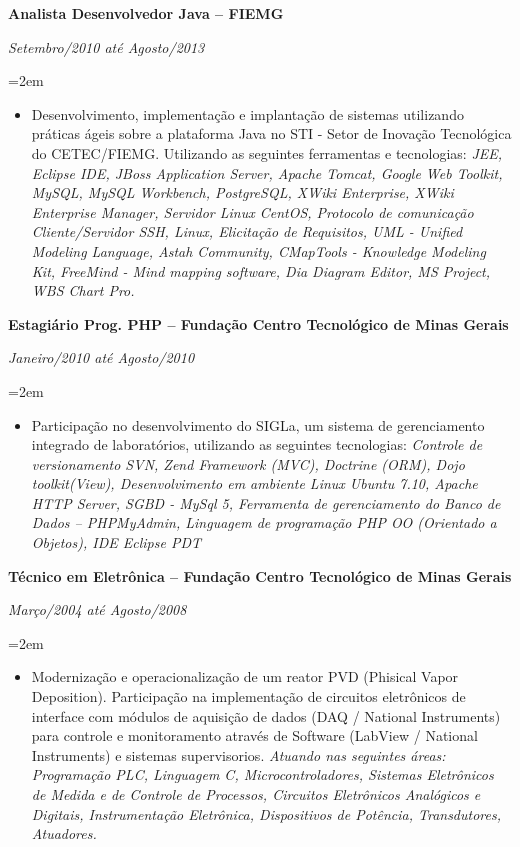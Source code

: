\documentclass[paper=a4,fontsize=11pt]{scrartcl} %
\newcommand{\EducationEntry}[4]{
		\noindent \textbf{#1} \hfill      %
		\colorbox{White}{%
			\parbox{5cm}{%
			\hfill\color{Black}#2}} \par  %
		\noindent \textit{#3} \par        %
		\noindent\hangindent=2em\hangafter=0 \small #4 %
		\normalsize \par}
\begin{document}
\EducationEntry{Analista Desenvolvedor Java – FIEMG}{}{Setembro/2010 até Agosto/2013}{
	\begin{itemize}
		\item{Desenvolvimento, implementação e implantação de sistemas utilizando práticas ágeis sobre 
		a plataforma Java no STI - Setor de Inovação Tecnológica do CETEC/FIEMG. Utilizando as seguintes ferramentas e tecnologias: \newline \newline
		      \textit{JEE, Eclipse IDE, JBoss Application Server, Apache Tomcat, Google Web Toolkit,
			  MySQL, MySQL Workbench, PostgreSQL, XWiki Enterprise, XWiki Enterprise
			  Manager, Servidor Linux CentOS, Protocolo de comunicação Cliente/Servidor SSH,
			  Linux, Elicitação de Requisitos, UML - Unified Modeling Language, Astah
			  Community, CMapTools - Knowledge Modeling Kit, FreeMind - Mind mapping
			  software, Dia Diagram Editor, MS Project, WBS Chart Pro.}}

	\end{itemize}
}

\EducationEntry{Estagiário Prog. PHP – Fundação Centro Tecnológico de Minas Gerais}{}{Janeiro/2010 até Agosto/2010}{
	\begin{itemize}
		\item{Participação no desenvolvimento do SIGLa, um sistema
		de gerenciamento integrado de laboratórios, utilizando as seguintes tecnologias: \newline \newline
		      \textit{Controle de versionamento SVN, Zend Framework (MVC), Doctrine (ORM), Dojo
			  toolkit(View), Desenvolvimento em ambiente Linux Ubuntu 7.10, Apache HTTP
			  Server, SGBD - MySql 5, Ferramenta de gerenciamento do Banco de Dados –
			  PHPMyAdmin, Linguagem de programação PHP OO (Orientado a Objetos), IDE
			  Eclipse PDT}}

	\end{itemize}
}

\EducationEntry{Técnico em Eletrônica – Fundação Centro Tecnológico de Minas Gerais}{}{Março/2004 até Agosto/2008}{
	\begin{itemize}
		\item{Modernização e operacionalização de um reator PVD (Phisical Vapor Deposition).
		Participação na implementação de circuitos eletrônicos de interface com módulos 
		de aquisição de dados (DAQ / National Instruments) para controle e monitoramento 
		através de Software (LabView / National Instruments) e sistemas supervisorios. \newline \newline
		      \textit{Atuando nas seguintes áreas:
			  Programação PLC, Linguagem C, Microcontroladores, Sistemas Eletrônicos de Medida e de Controle de Processos, Circuitos Eletrônicos Analógicos e Digitais, Instrumentação Eletrônica, Dispositivos de Potência, Transdutores, Atuadores.}}

	\end{itemize}
}
\end{document}
